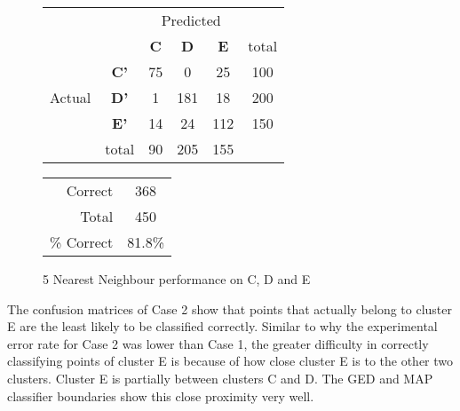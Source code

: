 	
\begin{figure}[!ht]
\begin{minipage}[b]{0.5\linewidth}
\centering
	\begin{tabular}{ccc|c|c|c}
	 & &\multicolumn{3}{c}{Predicted} &\\
	  & & \bf{C} &  \bf{D} & \bf{E} & total \\
	 \cline{3-6}
	 \multirow{3}{*}{\begin{sideways}Actual\end{sideways}} & \bf{C'}& 75 & 0 & 25 & 100\\
	 \cline{3-6}
	 & \bf{D'}& 1 & 181 & 18 & 200\\
	  \cline{3-6}
	 & \bf{E'}& 14 & 24 & 112 &  150\\
	  \cline{3-6}
	 &total&90&205&155\\
	\end{tabular}
\end{minipage}
\hspace{0.5cm}
\begin{minipage}[b]{0.5\linewidth}
	\begin{tabular}{r|c}
	\hline
	Correct& 368\\
	Total& 450\\
	\hline
	\% Correct& 81.8\%\\
	\hline
	\end{tabular}
\end{minipage}
\vspace{1mm}
\caption{5 Nearest Neighbour performance on C, D and E}
\end{figure}

The confusion matrices of Case 2 show that points that actually belong to cluster E are the least likely to be classified correctly. Similar to why the experimental error rate for Case 2 was lower than Case 1, the greater difficulty in correctly classifying points of cluster E is because of how close cluster E is to the other two clusters. Cluster E is partially between clusters C and D. The GED and MAP classifier boundaries show this close proximity very well.
 
\clearpage
